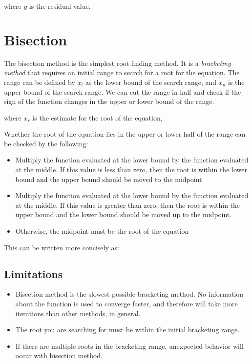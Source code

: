 \documentclass{../../KDHnotes}
\begin{document}

where $g$ is the residual value.

\section{Bisection}
The bisection method is the simplest root finding method. It is a \textit{bracketing method} that requires an initial range to search for a root for the equation. The range can be defined by $x_l$ as the lower bound of the search range, and $x_u$ is the upper bound of the search range. We can cut the range in half and check if the sign of the function changes in the upper or lower bound of the range.


where $x_r$ is the estimate for the root of the equation,

Whether the root of the equation lies in the upper or lower half of the range can be checked by the following:
\begin{itemize}
\item Multiply the function evaluated at the lower bound by the function evaluated at the middle. If this value is less than zero, then the root is within the lower bound and the upper bound should be moved to the midpoint
\item Multiply the function evaluated at the lower bound by the function evaluated at the middle. If this value is greater than zero, then the root is within the upper bound and the lower bound should be moved up to the midpoint.
\item Otherwise, the midpoint must be the root of the equation
\end{itemize}

This can be written more concisely as:


\subsection{Limitations}
\begin{itemize}
\item Bisection method is the slowest possible bracketing method. No information about the function is used to converge faster, and therefore will take more iterations than other methods, in general.
\item The root you are searching for must be within the initial bracketing range.
\item If there are multiple roots in the bracketing range, unexpected behavior will occur with bisection method.
\end{itemize}
\end{document}
